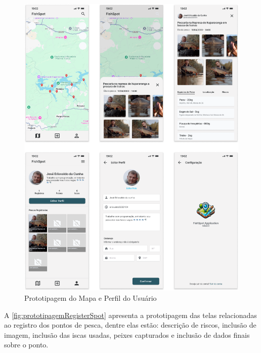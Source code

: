 \begin{figure}[H]
    \centering
    \caption{Prototipagem do Mapa e Perfil do Usuário}
    \label{fig:prototipagemMapPerfil}
    \includegraphics[scale=0.29]{./dados/figuras/prototipagem-map-perfil.png}
\end{figure}

A \autoref{fig:prototipagemRegisterSpot} apresenta a prototipagem das telas relacionadas ao registro dos pontos de pesca, dentre elas estão: descrição de riscos, inclusão de imagem, inclusão das iscas usadas, peixes capturados e inclusão de dados finais sobre o ponto.

